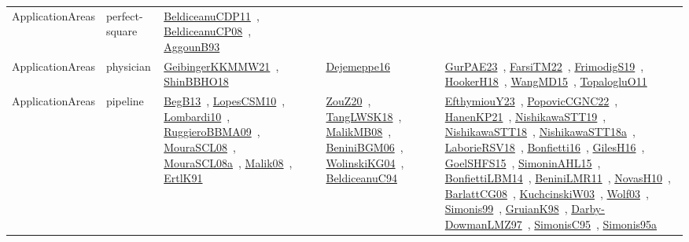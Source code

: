 {\begin{longtable}{lp{3cm}>{\raggedright\arraybackslash}p{6cm}>{\raggedright\arraybackslash}p{6cm}>{\raggedright\arraybackslash}p{8cm}}
ApplicationAreas & perfect-square & \href{works/BeldiceanuCDP11.pdf}{BeldiceanuCDP11}~\cite{BeldiceanuCDP11}, \href{works/BeldiceanuCP08.pdf}{BeldiceanuCP08}~\cite{BeldiceanuCP08}, \href{works/AggounB93.pdf}{AggounB93}~\cite{AggounB93} &  & \\
ApplicationAreas & physician & \href{works/GeibingerKKMMW21.pdf}{GeibingerKKMMW21}~\cite{GeibingerKKMMW21}, \href{works/ShinBBHO18.pdf}{ShinBBHO18}~\cite{ShinBBHO18} & \href{works/Dejemeppe16.pdf}{Dejemeppe16}~\cite{Dejemeppe16} & \href{works/GurPAE23.pdf}{GurPAE23}~\cite{GurPAE23}, \href{works/FarsiTM22.pdf}{FarsiTM22}~\cite{FarsiTM22}, \href{works/FrimodigS19.pdf}{FrimodigS19}~\cite{FrimodigS19}, \href{works/HookerH18.pdf}{HookerH18}~\cite{HookerH18}, \href{works/WangMD15.pdf}{WangMD15}~\cite{WangMD15}, \href{works/TopalogluO11.pdf}{TopalogluO11}~\cite{TopalogluO11}\\
ApplicationAreas & pipeline & \href{works/BegB13.pdf}{BegB13}~\cite{BegB13}, \href{works/LopesCSM10.pdf}{LopesCSM10}~\cite{LopesCSM10}, \href{works/Lombardi10.pdf}{Lombardi10}~\cite{Lombardi10}, \href{works/RuggieroBBMA09.pdf}{RuggieroBBMA09}~\cite{RuggieroBBMA09}, \href{works/MouraSCL08.pdf}{MouraSCL08}~\cite{MouraSCL08}, \href{works/MouraSCL08a.pdf}{MouraSCL08a}~\cite{MouraSCL08a}, \href{works/Malik08.pdf}{Malik08}~\cite{Malik08}, \href{works/ErtlK91.pdf}{ErtlK91}~\cite{ErtlK91} & \href{works/ZouZ20.pdf}{ZouZ20}~\cite{ZouZ20}, \href{works/TangLWSK18.pdf}{TangLWSK18}~\cite{TangLWSK18}, \href{works/MalikMB08.pdf}{MalikMB08}~\cite{MalikMB08}, \href{works/BeniniBGM06.pdf}{BeniniBGM06}~\cite{BeniniBGM06}, \href{works/WolinskiKG04.pdf}{WolinskiKG04}~\cite{WolinskiKG04}, \href{works/BeldiceanuC94.pdf}{BeldiceanuC94}~\cite{BeldiceanuC94} & \href{works/EfthymiouY23.pdf}{EfthymiouY23}~\cite{EfthymiouY23}, \href{works/PopovicCGNC22.pdf}{PopovicCGNC22}~\cite{PopovicCGNC22}, \href{works/HanenKP21.pdf}{HanenKP21}~\cite{HanenKP21}, \href{works/NishikawaSTT19.pdf}{NishikawaSTT19}~\cite{NishikawaSTT19}, \href{works/NishikawaSTT18.pdf}{NishikawaSTT18}~\cite{NishikawaSTT18}, \href{works/NishikawaSTT18a.pdf}{NishikawaSTT18a}~\cite{NishikawaSTT18a}, \href{works/LaborieRSV18.pdf}{LaborieRSV18}~\cite{LaborieRSV18}, \href{works/Bonfietti16.pdf}{Bonfietti16}~\cite{Bonfietti16}, \href{works/GilesH16.pdf}{GilesH16}~\cite{GilesH16}, \href{works/GoelSHFS15.pdf}{GoelSHFS15}~\cite{GoelSHFS15}, \href{works/SimoninAHL15.pdf}{SimoninAHL15}~\cite{SimoninAHL15}, \href{works/BonfiettiLBM14.pdf}{BonfiettiLBM14}~\cite{BonfiettiLBM14}, \href{works/BeniniLMR11.pdf}{BeniniLMR11}~\cite{BeniniLMR11}, \href{works/NovasH10.pdf}{NovasH10}~\cite{NovasH10}, \href{works/BarlattCG08.pdf}{BarlattCG08}~\cite{BarlattCG08}, \href{works/KuchcinskiW03.pdf}{KuchcinskiW03}~\cite{KuchcinskiW03}, \href{works/Wolf03.pdf}{Wolf03}~\cite{Wolf03}, \href{works/Simonis99.pdf}{Simonis99}~\cite{Simonis99}, \href{works/GruianK98.pdf}{GruianK98}~\cite{GruianK98}, \href{works/Darby-DowmanLMZ97.pdf}{Darby-DowmanLMZ97}~\cite{Darby-DowmanLMZ97}, \href{works/SimonisC95.pdf}{SimonisC95}~\cite{SimonisC95}, \href{works/Simonis95a.pdf}{Simonis95a}~\cite{Simonis95a}\\

\end{longtable}}
